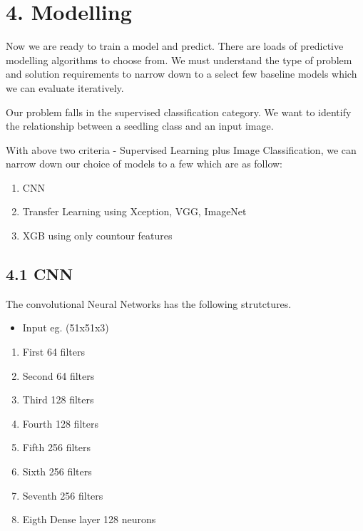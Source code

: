 \documentclass[11pt]{article}
\providecommand{\tightlist}{%
      \setlength{\itemsep}{0pt}\setlength{\parskip}{0pt}}
\begin{document}
    \hypertarget{modelling}{%
\section{4. Modelling}\label{modelling}}

    Now we are ready to train a model and predict. There are loads of
predictive modelling algorithms to choose from. We must understand the
type of problem and solution requirements to narrow down to a select few
baseline models which we can evaluate iteratively.

Our problem falls in the supervised classification category. We want to
identify the relationship between a seedling class and an input image.

With above two criteria - Supervised Learning plus Image Classification,
we can narrow down our choice of models to a few which are as follow:

\begin{enumerate}
\def\labelenumi{\arabic{enumi}.}
\tightlist
\item
  CNN
\item
  Transfer Learning using Xception, VGG, ImageNet
\item
  XGB using only countour features
\end{enumerate}

    \hypertarget{cnn}{%
\subsection{4.1 CNN}\label{cnn}}

    The convolutional Neural Networks has the following strutctures.

\begin{itemize}
\tightlist
\item
  Input eg. (51x51x3)
\end{itemize}

\begin{enumerate}
\def\labelenumi{\arabic{enumi}.}
\tightlist
\item
  First 64 filters
\item
  Second 64 filters
\item
  Third 128 filters
\item
  Fourth 128 filters
\item
  Fifth 256 filters
\item
  Sixth 256 filters
\item
  Seventh 256 filters
\item
  Eigth Dense layer 128 neurons
\end{enumerate}
\end{document}

